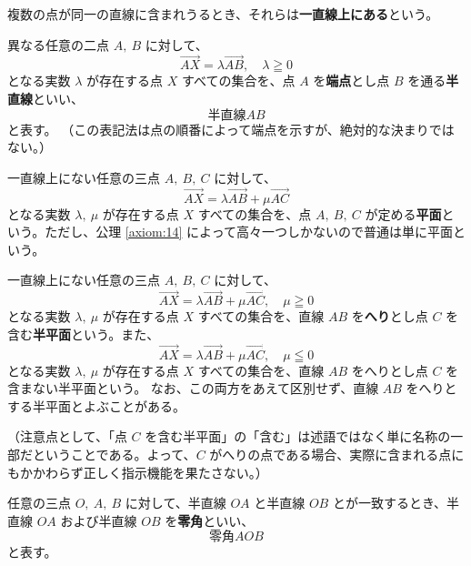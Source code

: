 \begin{dfn}[一直線上にある]\label{definition:7}
  複数の点が同一の直線に含まれうるとき、それらは\textbf{一直線上にある}という。
\end{dfn}

\begin{dfn}[半直線、端点]\label{definition:8}
  異なる任意の二点 \(A,\ B\) に対して、
  \[\overrightarrow{AX}=\lambda\overrightarrow{AB},\quad \lambda\geqq0\]
  となる実数 \(\lambda\) が存在する点 \(X\) すべての集合を、点 \(A\) を\textbf{端点}とし点 \(B\) を通る\textbf{半直線}といい、
  \[\text{半直線} AB\]
   と表す。
  （この表記法は点の順番によって端点を示すが、絶対的な決まりではない。）
\end{dfn}

\begin{dfn}[平面]\label{definition:9}
  一直線上にない任意の三点 \(A,\ B,\ C\) に対して、
  \[\overrightarrow{AX}=\lambda\overrightarrow{AB}+\mu\overrightarrow{AC}\]
  となる実数 \(\lambda,\ \mu\) が存在する点 \(X\) すべての集合を、点 \(A,\ B,\ C\) が定める\textbf{平面}という。ただし、公理 \ref{axiom:14} によって高々一つしかないので普通は単に平面という。
\end{dfn}

\begin{dfn}[半平面、へり]\label{definition:10}
  一直線上にない任意の三点 \(A,\ B,\ C\) に対して、
  \[\overrightarrow{AX}=\lambda\overrightarrow{AB}+\mu\overrightarrow{AC},\quad \mu\geqq0\]
  となる実数 \(\lambda,\ \mu\) が存在する点 \(X\) すべての集合を、直線 \(AB\) を\textbf{へり}とし点 \(C\) を含む\textbf{半平面}という。また、
  \[\overrightarrow{AX}=\lambda\overrightarrow{AB}+\mu\overrightarrow{AC},\quad \mu\leqq0\]
  となる実数 \(\lambda,\ \mu\) が存在する点 \(X\) すべての集合を、直線 \(AB\) をへりとし点 \(C\) を含まない半平面という。
  なお、この両方をあえて区別せず、直線 \(AB\) をへりとする半平面とよぶことがある。
\end{dfn}

（注意点として、「点 \(C\) を含む半平面」の「含む」は述語ではなく単に名称の一部だということである。よって、\(C\) がへりの点である場合、実際に含まれる点にもかかわらず正しく指示機能を果たさない。）

\begin{dfn}[零角]\label{definition:11}
  任意の三点 \(O,\ A,\ B\) に対して、半直線 \(OA\) と半直線 \(OB\) とが一致するとき、半直線 \(OA\) および半直線 \(OB\) を\textbf{零角}といい、
  \[\text{零角} AOB\]
  と表す。
\end{dfn}

